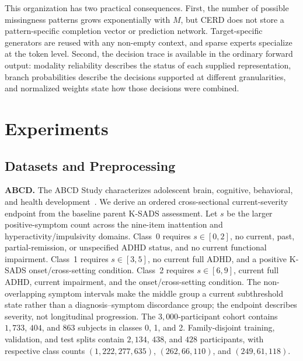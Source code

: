 \documentclass[a4paper,fleqn]{cas-dc}
\begin{document}
This organization has two practical consequences. First, the number of possible missingness patterns grows exponentially with \(M\), but CERD does not store a pattern-specific completion vector or prediction network. Target-specific generators are reused with any non-empty context, and sparse experts specialize at the token level. Second, the decision trace is available in the ordinary forward output: modality reliability describes the status of each supplied representation, branch probabilities describe the decisions supported at different granularities, and normalized weights state how those decisions were combined.

\section{Experiments}

\subsection{Datasets and Preprocessing}

\label{sec:datasets}

\noindent\textbf{ABCD.}
The ABCD Study characterizes adolescent brain, cognitive, behavioral, and health development~\cite{garavan2018abcd}. We derive an ordered cross-sectional current-severity endpoint from the baseline parent K-SADS assessment. Let \(s\) be the larger positive-symptom count across the nine-item inattention and hyperactivity/impulsivity domains. Class~0 requires \(s\in[0,2]\), no current, past, partial-remission, or unspecified ADHD status, and no current functional impairment. Class~1 requires \(s\in[3,5]\), no current full ADHD, and a positive K-SADS onset/cross-setting condition. Class~2 requires \(s\in[6,9]\), current full ADHD, current impairment, and the onset/cross-setting condition. The non-overlapping symptom intervals make the middle group a current subthreshold state rather than a diagnosis--symptom discordance group; the endpoint describes severity, not longitudinal progression. The \(3{,}000\)-participant cohort contains \(1{,}733\), \(404\), and \(863\) subjects in classes 0, 1, and 2. Family-disjoint training, validation, and test splits contain \(2{,}134\), \(438\), and \(428\) participants, with respective class counts \((1{,}222,277,635)\), \((262,66,110)\), and \((249,61,118)\).
\end{document}
